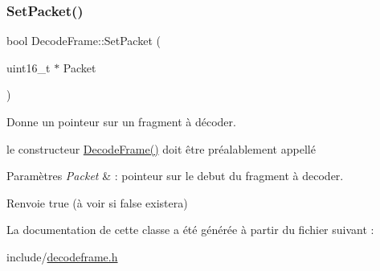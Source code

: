 \subsubsection{\texorpdfstring{Set\+Packet()}{SetPacket()}}
{\footnotesize\ttfamily bool Decode\+Frame\+::\+Set\+Packet (\begin{DoxyParamCaption}\item[{uint16\+\_\+t $\ast$}]{Packet }\end{DoxyParamCaption})}



Donne un pointeur sur un fragment à décoder. 

le constructeur \hyperlink{class_decode_frame_ae6ae88ee29bcaff936e7c7b2380f96b4}{Decode\+Frame()} doit être préalablement appellé 
\begin{DoxyParams}{Paramètres}
{\em Packet} & \+: pointeur sur le debut du fragment à decoder. \\
\hline
\end{DoxyParams}
\begin{DoxyReturn}{Renvoie}
true (à voir si false existera) 
\end{DoxyReturn}


La documentation de cette classe a été générée à partir du fichier suivant \+:\begin{DoxyCompactItemize}
\item 
include/\hyperlink{decodeframe_8h}{decodeframe.\+h}\end{DoxyCompactItemize}
